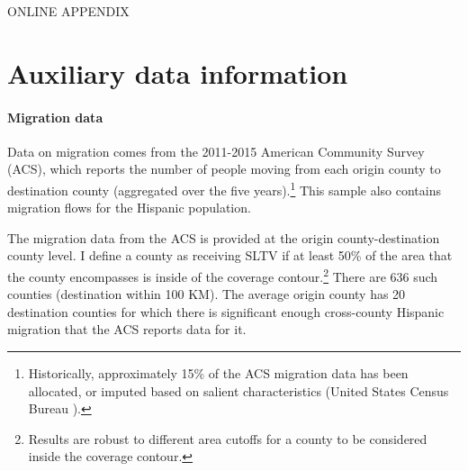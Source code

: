 \documentclass[11pt]{article}
\begin{document}
\renewcommand*{\theHsection}{\arabic{section}.\arabic{section}} 

\renewcommand*{\theHfigure}{\arabic{section}.\arabic{figure}} 
\setcounter{figure}{0}
\renewcommand\thefigure{A.\arabic{figure}}


\renewcommand*{\theHtable}{\arabic{section}.\arabic{table}} 
\setcounter{table}{0}
\renewcommand\thetable{A.\arabic{table}}

\renewcommand{\thesection}{Appendix \Alph{section}}

\onehalfspacing

\begin{center}
\Large ONLINE APPENDIX
\end{center}

\section{Auxiliary data information} \label{a:auxiliarydata}



\paragraph{Migration data}

Data on migration comes from the 2011-2015 American Community Survey (ACS), which reports the number of people moving from each origin county to destination county (aggregated over the five years).\footnote{ Historically, approximately 15\% of the ACS migration data has been allocated, or imputed based on salient characteristics (United States Census Bureau \cite{noauthor_american_2020}).} This sample also contains migration flows for the Hispanic population.

The migration data from the ACS is provided at the origin county-destination county level. I define a county as receiving SLTV if at least 50\% of the area that the county encompasses is inside of the coverage contour.\footnote{ Results are robust to different area cutoffs for a county to be considered inside the coverage contour.} There are 636 such counties (destination within 100 KM). The average origin county has 20 destination counties for which there is significant enough cross-county Hispanic migration that the ACS reports data for it.


\end{document}
